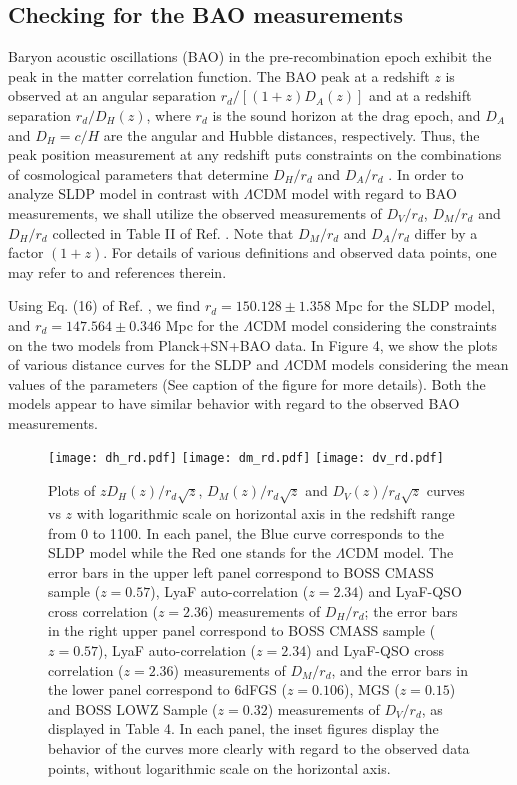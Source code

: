 \documentclass[11pt,a4paper]{article}
\begin{document}
\subsection{Checking for the BAO measurements}
Baryon acoustic oscillations (BAO) in the pre-recombination
epoch exhibit the peak in the matter correlation function. The BAO peak at a redshift $z$ is observed at an angular separation $r_d /[(1 + z)D_A (z)]$ and at a redshift separation
$r_d /D_H (z)$, where $r_d$ is the sound horizon at the drag
epoch, and $D_A$ and $D_H = c/H$ are the angular
and Hubble distances, respectively. Thus, the peak position measurement at any redshift puts
constraints on the combinations of cosmological parameters that determine $D_H /r_d$ and $D_A /r_d$ \cite{delubac15}. In order to analyze SLDP model in contrast with $\Lambda$CDM model with regard to BAO measurements, we shall utilize the observed measurements of $D_V/r_d$, $D_M/r_d$ and $D_H/r_d$ collected in Table II of Ref. \cite{aub14}. Note that $D_M/r_d$ and $D_A/r_d$ differ by a factor $(1+z)$. For details of various definitions and observed data points, one may refer to \cite{aub14} and references therein.


Using Eq. (16) of Ref. \cite{aub14}, we find $r_d=150.128\pm1.358$ Mpc for the SLDP model, and $r_d=147.564\pm0.346$ Mpc for the $\Lambda$CDM model considering the constraints on the two models from Planck+SN+BAO data. In Figure 4, we show the plots of various distance curves for the SLDP and $\Lambda$CDM models considering the mean values of the parameters (See caption of the figure for more details). Both the models appear to have similar behavior with regard to the observed BAO measurements. 

\begin{figure}[h]\centering
\texttt{[image: dh\_rd.pdf]}
\texttt{[image: dm\_rd.pdf]}
\texttt{[image: dv\_rd.pdf]}
\caption{\footnotesize{Plots of $zD_H(z)/r_d\sqrt{z}$, $D_M(z)/r_d\sqrt{z}$ and  $D_V(z)/r_d\sqrt{z}$ curves vs $z$ with logarithmic scale on horizontal axis in the redshift range from 0 to 1100. In each panel, the Blue curve corresponds to the SLDP model while the Red one stands for the $\Lambda$CDM model. The error bars in the upper left panel correspond to BOSS CMASS sample ($z=0.57$), LyaF auto-correlation ($z=2.34$) and LyaF-QSO cross correlation  ($z=2.36$) measurements of $D_H/r_d$; the error bars in the right upper panel correspond to BOSS CMASS sample ($z=0.57$), LyaF auto-correlation ($z=2.34$) and LyaF-QSO cross correlation ($z=2.36$) measurements of $D_M/r_d$, and the error bars in the lower panel correspond to 6dFGS ($z=0.106$), MGS ($z=0.15$) and BOSS LOWZ Sample ($z=0.32$) measurements of $D_V/r_d$, as displayed in Table 4. In each panel, the inset figures display the behavior of the curves more clearly with regard to the observed data points, without logarithmic scale on the horizontal axis.}}
\label{fig:5}
\end{figure}
\end{document}
